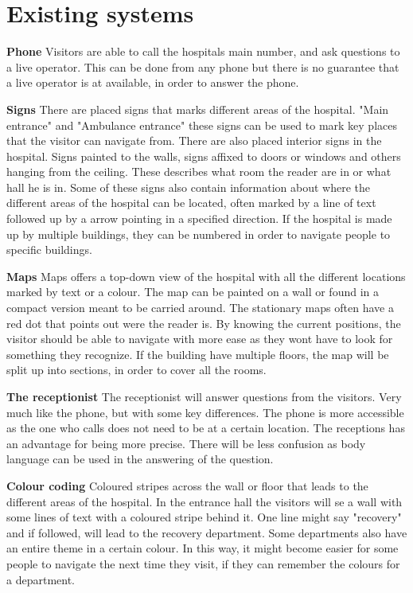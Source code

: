 \section{Existing systems} %
\label{sec:existing_systems}


\textbf{Phone}
Visitors are able to call the hospitals main number, and ask questions to a live operator. This can be done from any phone but there is no guarantee that a live operator is at available, in order to answer the phone.

\textbf{Signs}
There are placed signs that marks different areas of the hospital. "Main entrance" and "Ambulance entrance" these signs can be used to mark key places that the visitor can navigate from.
There are also placed interior signs in the hospital. Signs painted to the walls, signs affixed to doors or windows and others hanging from the ceiling. These describes what room the reader are in or what hall he is in. Some of these signs also contain information about where the different areas of the hospital can be located, often marked by a line of text followed up by a arrow pointing in a specified direction. If the hospital is made up by multiple buildings, they can be numbered in order to navigate people to specific buildings.

\textbf{Maps}
Maps offers a top-down view of the hospital with all the different locations marked by text or a colour. The map can be painted on a wall or found in a compact version meant to be carried around. The stationary maps often have a red dot that points out were the reader is. By knowing the current positions, the visitor should be able to navigate with more ease as they wont have to look for something they recognize. If the building have multiple floors, the map will be split up into sections, in order to cover all the rooms.

\textbf{The receptionist}
The receptionist will answer questions from the visitors. Very much like the phone, but with some key differences. The phone is more accessible as the one who calls does not need to be at a certain location. The receptions has an advantage for being more precise. There will be less confusion as body language can be used in the answering of the question.

\textbf{Colour coding}
Coloured stripes across the wall or floor that leads to the different areas of the hospital. In the entrance hall the visitors will se a wall with some lines of text with a coloured stripe behind it. One line might say "recovery" and if followed, will lead to the recovery department. Some departments also have an entire theme in a certain colour. In this way, it might become easier for some people to navigate the next time they visit, if they can remember the colours for a department. 


